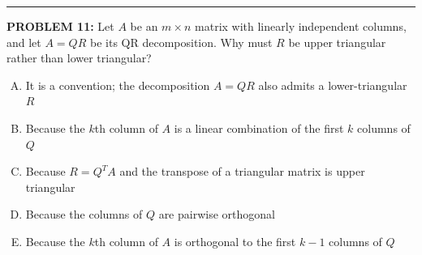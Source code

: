 \documentclass[12pt]{amsart}
\newcommand{\divider}{
  \vspace{-1em} %
  \noindent
  \raisebox{-0.15ex}{\textbullet}%
  \hspace{0.5em}%
  \rule[0.5ex]{0.95\textwidth}{1.0pt}%
  \hspace{0.5em}%
  \raisebox{-0.15ex}{\textbullet}%
  \vspace{0em} %
}
\newcommand{\norm}[1]{\|#1\|}
\begin{document}
\divider


{\bf PROBLEM 11:}
%
Let $A$ be an $m \times n$ matrix with linearly independent columns,
and let $A = QR$ be its QR decomposition.  Why must $R$ be upper triangular
rather than lower triangular?
%
\begin{enumerate}[(A)]
\item It is a convention; the decomposition $A = QR$ also admits a lower-triangular $R$
\item Because the $k$th column of $A$ is a linear combination of the first $k$ columns of $Q$
\item Because $R = Q^T A$ and the transpose of a triangular matrix is upper triangular
\item Because the columns of $Q$ are pairwise orthogonal
\item Because the $k$th column of $A$ is orthogonal to the first $k-1$ columns of $Q$
\end{enumerate}
%
%
%
%
\end{document}
